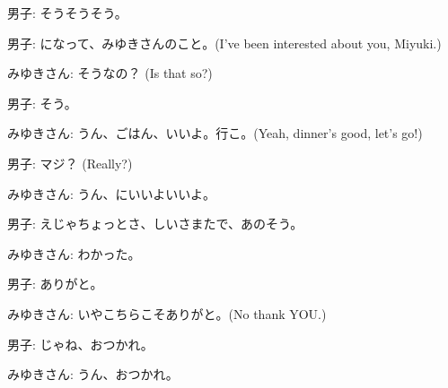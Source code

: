 \documentclass[../nihongo-gakushuu-kyouzai-grammar.tex]{subfiles}
\begin{document}
\begin{itemize}
    男子: そうそうそう。

    男子: になって、みゆきさんのこと。(I've been interested about you, Miyuki.)

    みゆきさん: そうなの？ (Is that so?)

    男子: そう。

    みゆきさん: うん、ごはん、いいよ。行こ。(Yeah, dinner's good, let's go!)

    男子: マジ？ (Really?)

    みゆきさん: うん、にいいよいいよ。

    男子: えじゃちょっとさ、しいさまたで、あのそう。

    みゆきさん: わかった。

    男子: ありがと。

    みゆきさん: いやこちらこそありがと。(No thank YOU.)

    男子: じゃね、おつかれ。

    みゆきさん: うん、おつかれ。
\end{itemize}
\end{document}

